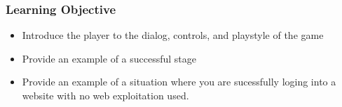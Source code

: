 \documentclass{article}
\begin{document}
\subsubsection{Learning Objective}

\begin{itemize}

  \item Introduce the player to the dialog, controls, and playstyle of
the game
  \item Provide an example of a successful stage
  \item Provide an example of a situation where you are sucessfully
loging into a website with no web exploitation used.

\end{itemize}
\end{document}
